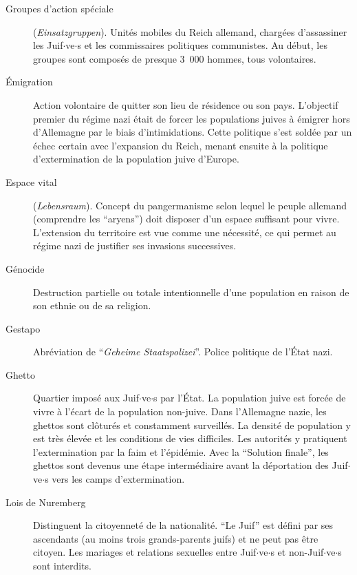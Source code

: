\begin{description}
    \item[Groupes d'action spéciale] (\textit{Einsatzgruppen}). Unités mobiles du Reich allemand, chargées d'assassiner les Juif$\cdot$ve$\cdot$s et les commissaires politiques communistes. Au début, les groupes sont composés de presque 3~000 hommes, tous volontaires.
    
    \item[Émigration] Action volontaire de quitter son lieu de résidence ou son pays. L'objectif premier du régime nazi était de forcer les populations juives à émigrer hors d'Allemagne par le biais d'intimidations. Cette politique s'est soldée par un échec certain avec l'expansion du Reich, menant ensuite à la politique d'extermination de la population juive d'Europe.
        
    \item[Espace vital] (\textit{Lebensraum}). Concept du pangermanisme selon lequel le peuple allemand (comprendre les \enquote{aryens}) doit disposer d'un espace suffisant pour vivre. L'extension du territoire est vue comme une nécessité, ce qui permet au régime nazi de justifier ses invasions successives.
    
    \item[Génocide] Destruction partielle ou totale intentionnelle d'une population en raison de son ethnie ou de sa religion.

    \item[Gestapo] Abréviation de \enquote{\textit{Geheime Staatspolizei}}. Police politique de l'État nazi.
    
    \item[Ghetto] Quartier imposé aux Juif$\cdot$ve$\cdot$s par l'État. La population juive est forcée de vivre à l'écart de la population non-juive. Dans l'Allemagne nazie, les ghettos sont clôturés et constamment surveillés. La densité de population y est très élevée et les conditions de vies difficiles. Les autorités y pratiquent l'extermination par la faim et l'épidémie. Avec la \enquote{Solution finale}, les ghettos sont devenus une étape intermédiaire avant la déportation des Juif$\cdot$ve$\cdot$s vers les camps d'extermination.
    
    \item[Lois de Nuremberg] Distinguent la citoyenneté de la nationalité. \enquote{Le Juif} est défini par ses ascendants (au moins trois grands-parents juifs) et ne peut pas être citoyen. Les mariages et relations sexuelles entre Juif$\cdot$ve$\cdot$s et non-Juif$\cdot$ve$\cdot$s sont interdits.
    

\end{description}

